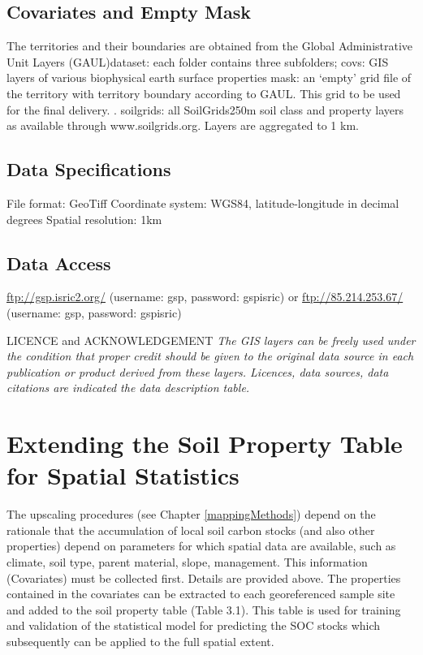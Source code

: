 \documentclass[10pt,b5paper,]{book}
\theoremstyle{definition}
\theoremstyle{definition}
\theoremstyle{definition}
\theoremstyle{remark}
\begin{document}
\hypertarget{covariates-and-empty-mask}{%
\subsection{Covariates and Empty Mask}\label{covariates-and-empty-mask}}

The territories and their boundaries are obtained from the Global
Administrative Unit Layers (GAUL)dataset: each folder contains three
subfolders; covs: GIS layers of various biophysical earth surface
properties mask: an `empty' grid file of the territory with territory
boundary according to GAUL. This grid to be used for the final delivery.
. soilgrids: all SoilGrids250m soil class and property layers as
available through www.soilgrids.org. Layers are aggregated to 1 km.

\hypertarget{data-specifications}{%
\subsection{Data Specifications}\label{data-specifications}}

File format: GeoTiff Coordinate system: WGS84, latitude-longitude in
decimal degrees Spatial resolution: 1km

\hypertarget{data-access}{%
\subsection{Data Access}\label{data-access}}

\url{ftp://gsp.isric2.org/} (username: gsp, password: gspisric) or
\url{ftp://85.214.253.67/} (username: gsp, password: gspisric)

LICENCE and ACKNOWLEDGEMENT \emph{The GIS layers can be freely used
under the condition that proper credit should be given to the original
data source in each publication or product derived from these layers.
Licences, data sources, data citations are indicated the data
description table.}

\hypertarget{extending-the-soil-property-table-for-spatial-statistics}{%
\section{Extending the Soil Property Table for Spatial
Statistics}\label{extending-the-soil-property-table-for-spatial-statistics}}

The upscaling procedures (see Chapter \ref{mappingMethods}) depend on
the rationale that the accumulation of local soil carbon stocks (and
also other properties) depend on parameters for which spatial data are
available, such as climate, soil type, parent material, slope,
management. This information (Covariates) must be collected first.
Details are provided above. The properties contained in the covariates
can be extracted to each georeferenced sample site and added to the soil
property table (Table 3.1). This table is used for training and
validation of the statistical model for predicting the SOC stocks which
subsequently can be applied to the full spatial extent.
\end{document}
